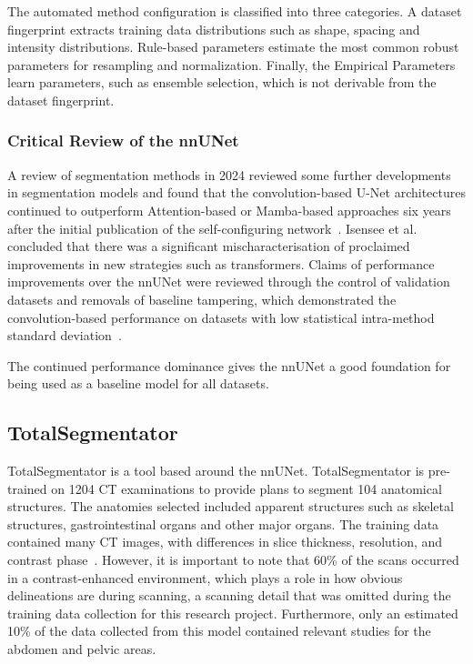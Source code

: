 \documentclass[12pt,twoside]{report}
\begin{document}
The automated method configuration is classified into three categories. A dataset fingerprint extracts training data distributions such as shape, spacing and intensity distributions. Rule-based parameters estimate the most common robust parameters for resampling and normalization. Finally, the Empirical Parameters learn parameters, such as ensemble selection, which is not derivable from the dataset fingerprint.

\subsubsection{Critical Review of the nnUNet}

A review of segmentation methods in 2024 reviewed some further developments in segmentation models and found that the convolution-based U-Net architectures continued to outperform Attention-based or Mamba-based approaches six years after the initial publication of the self-configuring network~\cite{isensee2024nnunet}. Isensee et al. concluded that there was a significant mischaracterisation of proclaimed improvements in new strategies such as transformers. Claims of performance improvements over the nnUNet were reviewed through the control of validation datasets and removals of baseline tampering, which demonstrated the convolution-based performance on datasets with low statistical intra-method standard deviation~\cite{isensee2024nnunet}.

The continued performance dominance gives the nnUNet a good foundation for being used as a baseline model for all datasets.

\subsection{TotalSegmentator}

TotalSegmentator is a tool based around the nnUNet. TotalSegmentator is pre-trained on 1204 CT examinations to provide plans to segment 104 anatomical structures. The anatomies selected included apparent structures such as skeletal structures, gastrointestinal organs and other major organs. The training data contained many CT images, with differences in slice thickness, resolution, and contrast phase~\cite{totalsegmentor-paper}. However, it is important to note that 60\% of the scans occurred in a contrast-enhanced environment, which plays a role in how obvious delineations are during scanning, a scanning detail that was omitted during the training data collection for this research project. Furthermore, only an estimated 10\% of the data collected from this model contained relevant studies for the abdomen and pelvic areas.
\end{document}
